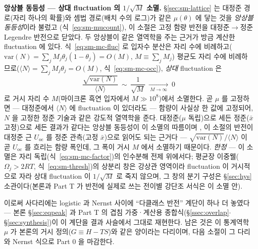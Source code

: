 \begin{bgbox}
\textbf{앙상블 동등성 --- 상대 fluctuation 의 $1/\sqrt{M}$ 소멸.} \S\ref{sec:sm-lattice} 는 대정준 경로(자리 하나의
확률)와 셈법 경로(배치 수의 로그)가 같은 $\mu(\theta)$ 에 닿는 것을 \emph{앙상블 동등성}이라 불렀고
(식~\eqref{eq:sm-mucount}), 이 소절은 고정 함량 반전을 대정준$\to$정준 Legendre 반전으로 닫았다. 두 앙상블이
같은 열역학을 주는 근거가 방금 계산한 fluctuation 에 있다. 식~\eqref{eq:sm-mc-fluc} 로 입자수 분산은 자리 수에
비례하고($\mathrm{var}(N)=\sum_jM_j\theta_j(1-\theta_j)=O(M)$, $M\equiv\sum_jM_j$) 평균도 자리 수에
비례하므로($\langle N\rangle=\sum_jM_j\theta_j=O(M)$, 식~\eqref{eq:sm-mc-occ}), \emph{상대} fluctuation 은
\[
\frac{\sqrt{\mathrm{var}(N)}}{\langle N\rangle}\ \sim\ \frac{1}{\sqrt{M}}
\ \xrightarrow[\ M\to\infty\ ]{}\ 0
\]
로 거시 자리 수 $M$(마이크론 흑연 입자에서 $M\gg10^{8}$)에서 소멸한다. 곧 $\mu$ 를 고정하면 --- 대정준에서
$\langle N\rangle$ 에 fluctuation 이 있더라도 --- 함량이 사실상 한 값에 고정되어, $N$ 을 고정한 정준 기술과 같은 강도적
열역학을 준다. 대정준($\mu$ 독립)으로 세든 정준($\bar x$ 고정)으로 세든 결과가 같다는 앙상블 동등성이 이
소멸의 따름이며 \cite{hill1960,mcquarrie1976}, 이 소절의 반전이 대정준 근 $U_\mathrm{oc}$ 를 정준 관측(고정
$\bar x$)으로 읽어도 되는 근거다 --- $\sqrt{\mathrm{var}(N)}/\langle N\rangle$ 이 곧 $U_\mathrm{oc}$ 를
흐리는 함량 폭인데, 그 폭이 거시 $M$ 에서 소멸하기 때문이다. \emph{한정} --- 이 소멸은 자리
독립(식~\eqref{eq:sm-mc-factor})의 인수분해 전제 위에서다; 평균장 이중웰($\Omega_j>2RT$,
식~\eqref{eq:sm-thresh})의 상분리 창은 강상관 영역이라 fluctuation 이 거시적으로 자라 상대 fluctuation 이 $1/\sqrt{M}$ 로 죽지
않으며, 그 창의 분기 구성은 \S\ref{sec:hys} 소관이다(본론과 Part T 가 반전에 실제로 쓰는 전이별 강단조
서식은 이 소멸 안).
\end{bgbox}

이로써 사다리에는 logistic 과 Nernst 사이에 ``다클래스 반전'' 계단이 하나 더 놓였다 --- 본론
\S\ref{sec:eqpeak} 과 Part T 의 겹침 가중·계산용 종합식(\S\ref{ssec:overlap}$\cdot$\S\ref{sec:synthesis})이 이 계단을 결과 사슬에서 그대로 재현한다. 남은
것은 이 통계역학 $\mu$ 가 본론의 거시 정의($G\equiv H-TS$)와 같은 양이라는 다리이며, 다음 소절이 그 다리와
Nernst 식으로 Part 0 을 마감한다.


